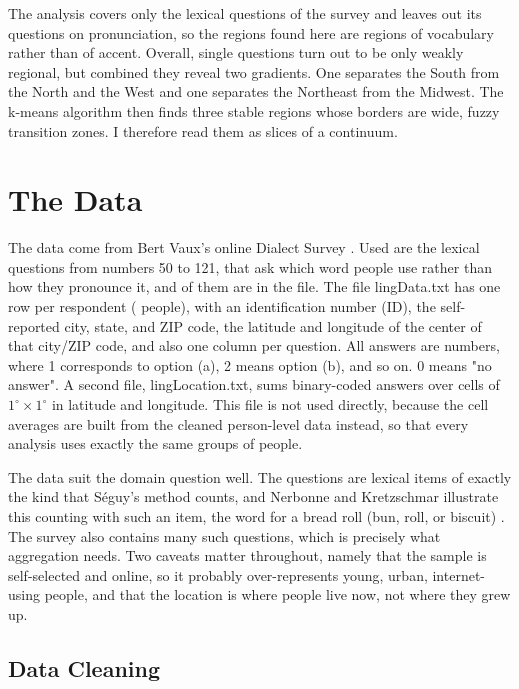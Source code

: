 \documentclass[10pt,letterpaper]{article}
\begin{document}
The analysis covers only the lexical questions of the survey and leaves out its questions on pronunciation, so the regions found here are regions of vocabulary rather than of accent. Overall, single questions turn out to be only weakly regional, but combined they reveal two gradients. One separates the South from the North and the West and one separates the Northeast from the Midwest. The k-means algorithm then finds three stable regions whose borders are wide, fuzzy transition zones. I therefore read them as slices of a continuum.

\section{The Data}\label{data}

The data come from Bert Vaux's online Dialect Survey \cite{vauxsurvey}. Used are the lexical questions from numbers 50 to 121, that ask which word people use rather than how they pronounce it, and \nQuestions{} of them are in the file. The file lingData.txt has one row per respondent (\nRaw{} people), with an identification number (ID), the self-reported city, state, and ZIP code, the latitude and longitude of the center of that city/ZIP code, and also one column per question. All answers are numbers, where 1 corresponds to option (a), 2 means option (b), and so on. 0 means "no answer". A second file, lingLocation.txt, sums binary-coded answers over cells of $1^\circ\times1^\circ$ in latitude and longitude. This file is not used directly, because the cell averages are built from the cleaned person-level data instead, so that every analysis uses exactly the same groups of people.

The data suit the domain question well. The questions are lexical items of exactly the kind that S\'eguy's method counts, and Nerbonne and Kretzschmar illustrate this counting with such an item, the word for a bread roll (bun, roll, or biscuit) \cite[p.~248]{nerbonne2003introducing}. The survey also contains many such questions, which is precisely what aggregation needs. Two caveats matter throughout, namely that the sample is self-selected and online, so it probably over-represents young, urban, internet-using people, and that the location is where people live now, not where they grew up.

\subsection{Data Cleaning}\label{data-cleaning}
\end{document}
